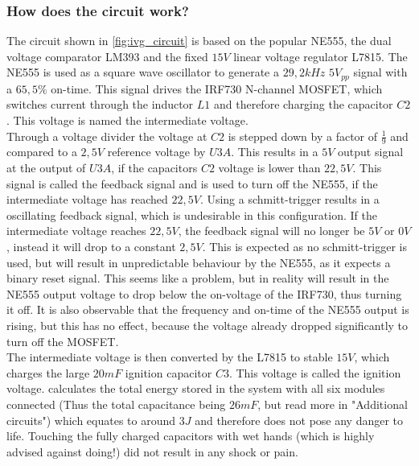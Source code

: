 \pagebreak

\subsubsection{How does the circuit work?}

\noindent The circuit shown in \cref{fig:ivg_circuit} is based on the popular NE555, the dual voltage comparator LM393 and the fixed $15V$ linear voltage regulator L7815. The NE555 is used as a square wave oscillator to generate a $29,2kHz$ $5V_{pp}$ signal with a $65,5\%$ on-time. This signal drives the IRF730 N-channel MOSFET, which switches current through the inductor $L1$ and therefore charging the capacitor $C2$. This voltage is named the intermediate voltage.\\

\noindent Through a voltage divider the voltage at $C2$ is stepped down by a factor of $\frac{1}{9}$ and compared to a $2,5V$ reference voltage by $U3A$. This results in a $5V$ output signal at the output of $U3A$, if the capacitors $C2$ voltage is lower than $22,5V$. This signal is called the feedback signal and is used to turn off the NE555, if the intermediate voltage has reached $22,5V$. Using a schmitt-trigger results in a oscillating feedback signal, which is undesirable in this configuration. If the intermediate voltage reaches $22,5V$, the feedback signal will no longer be $5V$ or $0V$, instead it will drop to a constant $2,5V$. This is expected as no schmitt-trigger is used, but will result in unpredictable behaviour by the NE555, as it expects a binary reset signal. This seems like a problem, but in reality will result in the NE555 output voltage to drop below the on-voltage of the IRF730, thus turning it off. It is also observable that the frequency and on-time of the NE555 output is rising, but this has no effect, because the voltage already dropped significantly to turn off the MOSFET. \\

\noindent The intermediate voltage is then converted by the L7815 to stable $15V$, which charges the large $20mF$ ignition capacitor $C3$. This voltage is called the ignition voltage.  calculates the total energy stored in the system with all six modules connected (Thus the total capacitance being $26mF$, but read more in  "Additional circuits") which equates to around $3J$ and therefore does not pose any  danger to life. Touching the fully charged capacitors with wet hands (which is highly advised against doing!) did not result in any shock or pain.\\

